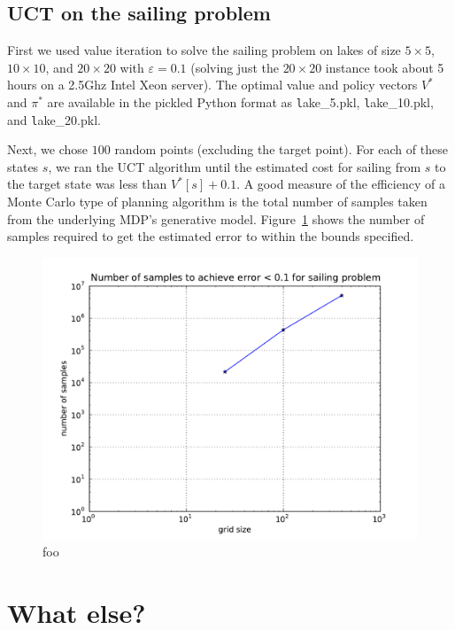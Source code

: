 \documentclass[10pt,amstags,fleqn]{article}
\theoremstyle{plain}
\theoremstyle{definition}
\theoremstyle{definition}
\begin{document}
\subsection{UCT on the sailing problem}

First we used value iteration to solve the sailing problem on lakes of size
$5 \times 5$,
$10 \times 10$, and $20 \times 20$ with $\varepsilon =
0.1$ (solving just the $20 \times 20$ instance took about 5
hours on a 2.5Ghz Intel Xeon server).
The optimal value and policy vectors $V^*$ and $\pi^*$ 
are available in the pickled Python format as
{\texttt lake\_5.pkl},
{\texttt lake\_10.pkl}, and
{\texttt lake\_20.pkl}.

Next, we chose $100$ random points (excluding the target point). For
each of these states $s$, we ran the UCT algorithm until the estimated
cost for sailing from $s$ to the target state was less than $V^*[s] +
0.1$. A good measure of the efficiency of a Monte Carlo type of planning
algorithm is the total number of samples taken from the underlying MDP's
generative model. Figure~\ref{uctsailing} shows the number of samples
required to get the estimated error to within the bounds specified.
\begin{figure}[htb]
\begin{center}
\includegraphics[width=.75\textwidth]{nr_samples_uct_sailing.pdf}
\end{center}
\caption{foo}\label{uctsailing}
\end{figure}

\section{What else?}
\end{document}
